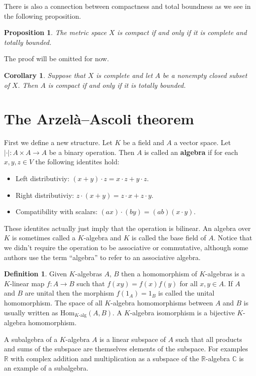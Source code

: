 \documentclass[11pt,a4paper]{article}
\theoremstyle{definition}
\newtheorem{definition}{Definition}[section]
\theoremstyle{plain}
\newtheorem{proposition}[theorem]{Proposition}
\newtheorem{corollary}[theorem]{Corollary}
\newcommand{\R}{\mathbb{R}}
\newcommand{\C}{\mathbb{C}}
\begin{document}
  There is also a connection between compactness and total boundness as
  we see in the following proposition.
  
  \begin{proposition}
    The metric space $X$ is compact if and only if it is complete
    and totally bounded.
  \end{proposition}
  
  The proof will be omitted for now.
  
  \begin{corollary}
    Suppose that $X$ is complete and let $A$ be a nonempty closed subset
    of $X$. Then $A$ is compact if and only if it is totally bounded.
  \end{corollary}

  \newpage

  \section{The Arzelà–Ascoli theorem}\label{sec:the-AA-theorem}
  First we define a new structure. Let $K$ be a field and $A$ a vector 
  space. Let $|\cdot| \colon A \times A \to A$ be a binary operation.
  Then $A$ is called an \textbf{algebra} if for each $x,y,z \in V$ 
  the following identites hold:
  \begin{itemize}
    \item Left distributiviy: $(x + y) \cdot z = x \cdot z + y \cdot z$.
    \item Right distributiviy: $z \cdot (x + y) = z \cdot x + z \cdot y$.
    \item Compatibility with scalars: 
    $(ax) \cdot (by) = (ab) (x \cdot y)$.
  \end{itemize}
  These identites actually just imply that the operation is bilinear.
  An algebra over $K$ is sometimes called a $K$-algebra and $K$ is
  called the base field of $A$. Notice that we didn't require the operation
  to be associative or commutative, although some authors use the term
  ``algebra'' to refer to an associative algebra.
  \begin{definition}
    Given $K$-algebras $A$, $B$ then a homomorphism of $K$-algebras
    is a $K$-linear map $f \colon A \to B$ such that $f(xy)=f(x)f(y)$
    for all $x,y \in A$. If $A$ and $B$ are unital then the morphism
    $f(1_A) = 1_B$ is called the unital homomorphism. The space
    of all $K$-algebra homomorphisms between $A$ and $B$ is usually 
    written as ${\mathrm{Hom}}_{K\text{-alg}}(A,B)$. A $K$-algebra
    isomorphism is a bijective $K$-algebra homomorphism.
  \end{definition}
  A subalgebra of a $K$-algebra $A$ is a linear subspace of $A$ such
  that all products and sums of the subspace are themselves elements
  of the subspace. For examples $\R$ with complex addition and 
  multiplication as a subspace of the $\R$-algebra $\C$ is an example
  of a subalgebra.
\end{document}
